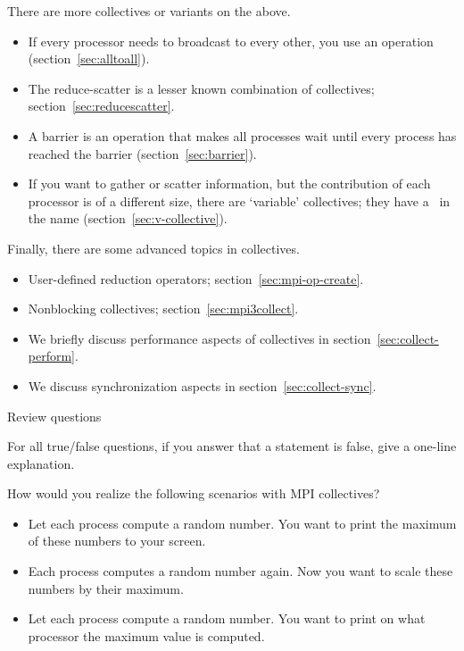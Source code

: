 There are more collectives or variants on the above.
\begin{itemize}
\item If every processor needs to broadcast to every other, you use an
   operation (section~\ref{sec:alltoall}).
\item The reduce-scatter is a lesser known combination of collectives;
  section~\ref{sec:reducescatter}.
\item A barrier is an operation that makes all processes wait until every
  process has reached the barrier (section~\ref{sec:barrier}).
\item If you want to gather or scatter information, but the contribution
  of each processor is of a different size, there are `variable' collectives;
  they have a~ in the name (section~\ref{sec:v-collective}).
\end{itemize}

Finally, there are some advanced topics in collectives.
\begin{itemize}
\item User-defined reduction operators; section~\ref{sec:mpi-op-create}.
\item Nonblocking collectives; section~\ref{sec:mpi3collect}.
\item We briefly discuss performance aspects of collectives in section~\ref{sec:collect-perform}.
\item We discuss synchronization aspects in section~\ref{sec:collect-sync}.
\end{itemize}













 {Review questions}

For all true/false questions, if you answer that a statement is false,
give a one-line explanation.

\begin{review}
  How would you realize the following scenarios with MPI collectives?
  \begin{itemize}
  \item Let each process compute a random number. You want to print the
    maximum of these numbers to your screen.
  \item Each process computes a random number again. Now you want to
    scale these numbers by their maximum. 
  \item Let each process compute a random number. You want to print on what processor the
    maximum value is computed. 
  \end{itemize}
\end{review}

